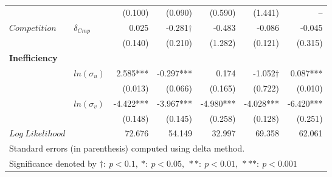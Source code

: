 \begin{table}[htbp]
\begin{adjustwidth}{-0cm}{0cm}
{\begin{tabular}{llrrrrr}
  & & (0.100) & (0.090) & (0.590) & (1.441) & -- \\
$Competition$ & $\delta_{Cmp}$  & 0.025  & -0.281$\dag$ & -0.483  & -0.086  & -0.045  \\
  & & (0.140) & (0.210) & (1.282) & (0.121) & (0.315) \\
\midrule
\multicolumn{5}{l}{\textbf{Inefficiency}} \\
\midrule   
& $ln(\sigma_{u})$  & 2.585*** & -0.297*** & 0.174  & -1.052$\dag$ & 0.087*** \\
  & & (0.013) & (0.066) & (0.165) & (0.722) & (0.010) \\
 & $ln(\sigma_{v})$  & -4.422*** & -3.967*** & -4.980*** & -4.028*** & -6.420*** \\
  & & (0.148) & (0.145) & (0.258) & (0.128) & (0.251) \\
\midrule
$Log~Likelihood$ &  & 72.676  & 54.149  & 32.997  & 69.358  & 62.061  \\
\bottomrule 
\multicolumn{7}{l}{Standard errors (in parenthesis) computed using delta method.}\\
\multicolumn{7}{l}{Significance denoted by $\dag:~p<0.1,~*:~p<0.05,~**:~p<0.01,~***:~p<0.001$} 
 \end{tabular}
  }    
\end{adjustwidth} 
\end{table}

